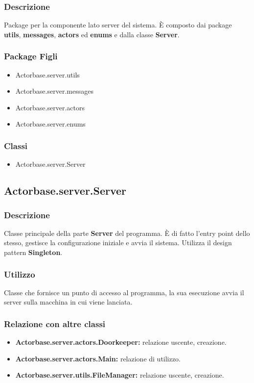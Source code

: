 \documentclass[a4paper]{article}
\begin{document}
			\subsubsection{Descrizione}
				Package per la componente lato server del sistema. 
				È composto dai package \textbf{utils}, \textbf{messages}, \textbf{actors} ed \textbf{enums} e dalla classe \textbf{Server}.\\
				
			\subsubsection{Package Figli}
				\begin{itemize}
					\item Actorbase.server.utils
					\item Actorbase.server.messages
					\item Actorbase.server.actors
					\item Actorbase.server.enums
				\end{itemize}
				
			\subsubsection{Classi}
				\begin{itemize}
					\item Actorbase.server.Server
				\end{itemize}
				
		\subsection{Actorbase.server.Server}
			\subsubsection{Descrizione}
				Classe principale della parte \textbf{Server} del programma. È di fatto l'entry point dello stesso, gestisce la configurazione 
				iniziale e avvia il sistema. Utilizza il design pattern \textbf{Singleton}.
				
			\subsubsection{Utilizzo}
				Classe che fornisce un punto di accesso al programma, la sua esecuzione avvia il server sulla macchina in cui viene lanciata.
				
			\subsubsection{Relazione con altre classi}
				\begin{itemize}
					\item \textbf{Actorbase.server.actors.Doorkeeper:} relazione uscente, creazione.
					\item \textbf{Actorbase.server.actors.Main:} relazione di utilizzo.
					\item \textbf{Actorbase.server.utils.FileManager:} relazione uscente, creazione.
				\end{itemize}
				
\end{document}
